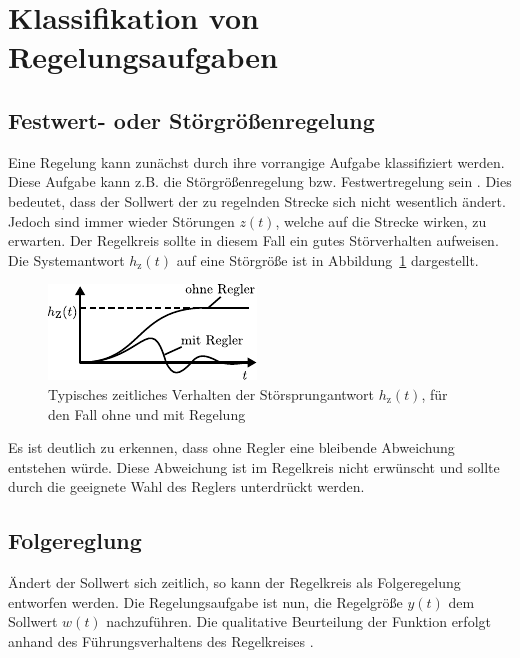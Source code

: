 \section{Klassifikation von Regelungsaufgaben}
%
\subsection{Festwert- oder Störgrößenregelung}
\label{sec:Klassifikation}
%
Eine Regelung kann zunächst durch ihre vorrangige Aufgabe klassifiziert werden. Diese Aufgabe kann z.B. die Störgrößenregelung bzw. Festwertregelung sein \cite{MSF05,Zacher17}. Dies bedeutet, dass der Sollwert der zu regelnden Strecke sich nicht wesentlich ändert. Jedoch sind immer wieder Störungen $z(t)$, welche auf die Strecke wirken, zu erwarten. Der Regelkreis sollte in diesem Fall ein gutes Störverhalten aufweisen. Die Systemantwort $h_{\text{z}}(t)$ auf eine Störgröße ist in Abbildung~\ref{fig:festwert} dargestellt.
%
\begin{figure}[h]
	\centering
	\includegraphics[width=0.4\linewidth]{Abbildungen/Grundbegriffe/PDF/FestwertRegelung.pdf}
	\caption{Typisches zeitliches Verhalten der Störsprungantwort $h_{\text{z}}(t)$, für den Fall ohne und mit Regelung}
	\label{fig:festwert}
\end{figure}
%
Es ist deutlich zu erkennen, dass ohne Regler eine bleibende Abweichung entstehen würde. Diese Abweichung ist im Regelkreis nicht erwünscht und sollte durch die geeignete Wahl des Reglers unterdrückt werden.
%
\subsection{Folgereglung}
%
Ändert der Sollwert sich zeitlich, so kann der Regelkreis als Folgeregelung entworfen werden. Die Regelungsaufgabe ist nun, die Regelgröße $y(t)$ dem Sollwert $w(t)$ nachzuführen. Die qualitative Beurteilung der Funktion erfolgt anhand des Führungsverhaltens des Regelkreises \cite{Lunze10}. 
%

